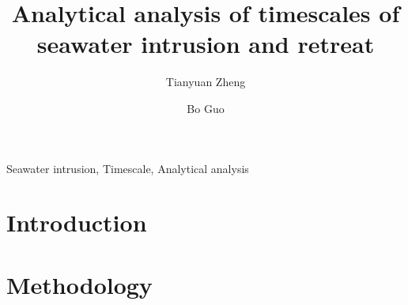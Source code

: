 \documentclass[review]{elsarticle}
\begin{document}
\begin{frontmatter}

\title{Analytical analysis of timescales of seawater intrusion and retreat}

\author[label1,label2]{Tianyuan Zheng}
\author[label3]{Bo Guo}
\address[label1]{Department of Environmental Informatics, Helmholtz Centre for Environmental Research - UFZ, Permoserstra{\ss}e 15, 04318 Leipzig, Germany}
\address[label2]{Applied Environmental Systems Analysis, Dresden University of Technology, Germany}
\address[label3]{Civil and Environmental Engineering, Princeton University, NJ, US, 08544}




\begin{abstract}

\end{abstract}

\begin{keyword}
Seawater intrusion, Timescale, Analytical analysis
\end{keyword}

\end{frontmatter}

\linenumbers

\section{Introduction}

\section{Methodology}
\end{document}
